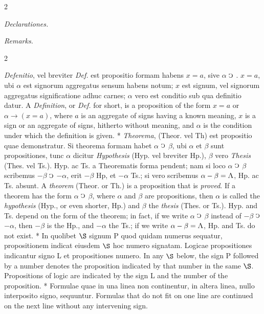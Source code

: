 \documentclass{book}
\newcommand{\C}{\mathop{\sbox0{$\displaystyle$$\reflectbox{C}$} %
\raisebox{-\height+\ht0-0.05cm}[\ht0][\dp0]{\scalebox{0.8}[0.8]{\copy0}}}\displaylimits} %
\newcommand{\abs}{\mathop{\rotatebox[origin=c]{180}{V}}}
\newcommand\peanoHeadingSmall[1]{ \vspace{0.75cm} \textit{#1} \nopagebreak[4]

\vspace{0.25cm} \nopagebreak[1]}
\newenvironment{translateTwoCol}
               { %
                 \columnratio{0.5, 0.5} \begin{paracol}{2}
                 \newcommand{\LAT}{\switchcolumn[0]*}
                 \newcommand{\ENG}{\switchcolumn[1]}
               }
               { %
                 \let\ENG\undefined
                 \let\LAT\undefined
                 \end{paracol}
               }
\begin{document}
\begin{translateTwoCol}
\centering
{}
{}
\peanoHeadingSmall{Declarationes.}
\ENG
\peanoHeadingSmall{Remarks.}
\end{translateTwoCol}

\begin{translateTwoCol}
\emph{Defenitio}, vel breviter \emph{Def.} est propositio formam habens $x = a$, sive $\alpha$ $\C$ . $x = a$, ubi $\alpha$ est signorum aggregatus sensum habens notum; $x$ est signum, vel signorum aggregatus significatione adhuc carnes; $\alpha$ vero est conditio sub qua definitio datur.
\ENG
A \emph{Definition}, or \emph{Def.} for short, is a proposition of the form $x=a$ or $\alpha \rightarrow (x = a)$, where $a$ is an aggregate of signs having a known meaning, $x$ is a sign or an aggregate of signs, hitherto without meaning, and $\alpha$ is the condition under which the definition is given.
\LAT
\emph{Theorema}, (Theor. vel Th) est propositio quae demonstratur. Si theorema formam habet $\alpha$ $\C$ $\beta$, ubi $\alpha$ et $\beta$ sunt propositiones, tunc $\alpha$ dicitur \emph{Hypothesis} (Hyp. vel breviter Hp.), $\beta$ vero \emph{Thesis} (Thes. vel Ts.). Hyp. ac Ts. a Theorematis forma pendent; nam si loco $\alpha$ $\C$ $\beta$ scribemus $- \beta$ $\C$ $- \alpha$, erit $- \beta$ Hp, et $- \alpha$ Ts.; si vero scribemus $\alpha - \beta = \abs$, Hp. ac Ts. absunt.
\ENG
A \emph{theorem} (Theor. or Th.) is a proposition that is \emph{proved}. If a theorem has the form $\alpha$ $\C$ $\beta$, where $\alpha$ and $\beta$ are propositions, then $\alpha$ is called the \emph{hypothesis} (Hyp., or even shorter, Hp.) and $\beta$ the \emph{thesis} (Thes. or Ts.). Hyp. and Ts. depend on the form of the theorem; in fact, if we write $\alpha$ $\C$ $\beta$ instead of $- \beta$ $\C$ $- \alpha$, then $- \beta$ is the Hp., and $- \alpha$ the Ts.; if we write $\alpha - \beta = \abs$, Hp. and Ts. do not exist.
\LAT
In quolibet $\S$ signum P quod quidam numerus sequatur, propositionem indicat eiusdem $\S$ hoc numero signatam. Logicae propositiones indicantur signo L et propositiones numero.
\ENG
In any $\S$ below, the sign P followed by a number denotes the proposition indicated by that number in the same $\S$. Propositions of logic are indicated by the sign L and the number of the proposition.
\LAT
Formulae quae in una linea non continentur, in altera linea, nullo interposito signo, sequuntur.
\ENG
Formulas that do not fit on one line are continued on the next line without any intervening sign.
\end{translateTwoCol}
\end{document}
